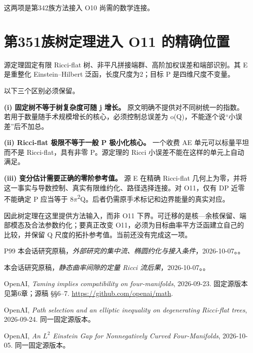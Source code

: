\documentclass[UTF8,11pt,fontset=none]{ctexart}
\begin{document}
这两项是第342族方法接入 O10 尚需的数学连接。

\section{第351族树定理进入 O11 的精确位置}\label{ch6:ux7b2c351ux65cfux6811ux5b9aux7406ux8fdbux5165-o11-ux7684ux7cbeux786eux4f4dux7f6e}

源定理固定有限 Ricci-flat 树、非平凡拼接端群、高阶加权误差和端部识别。其 E 是重整化 Einstein--Hilbert 泛函，长度尺度为2；目标 P 是四维尺度不变量。

以下三个区别必须保留。

\textbf{(i) 固定树不等于树复杂度可随 j 增长。} 原文明确不提供对不同树统一的指数。若用于数量随手术规模增长的核心，必须控制总误差为 o(Q)，不能逐个说``小误差''后不加总。

\textbf{(ii) Ricci-flat 极限不等于一般 P 极小化核心。} 一个收费 AE 单元可以标量平坦而不是 Ricci-flat，具有非零 P。源定理的 Ricci 小误差不能在这样的单元上自动满足。

\textbf{(iii) 变分估计需要正确的零阶参考值。} 源 E 在精确 Ricci-flat 几何上为零，并将这一事实与导数控制、真实有限维约化、路径选择连接。对 O11，仅有 DP 近零不能确定 P 应当等于 8\(\pi\)\textsuperscript{2}Q。后者仍需原手术标记和边界能量的真实对应。

因此树定理在这里提供方法输入，而非 O11 下界。可迁移的是核---余核保留、端部模态及合法参数约化；要真正改变 O11，必须为目标曲率平方泛函建立自己的比较，并保留 Q 尺度的拓扑参考值。当前还没有完成这一项。

\begin{thebibliography}{P99}
\small
{} 本会话研究原稿，\emph{外部研究的集中流、椭圆约化与接入条件}，2026-10-07。。

 本会话研究原稿，\emph{静态曲率间隙的定量 Ricci 流后果}，2026-10-07。。

 OpenAI, \emph{Taming implies compatibility on four-manifolds}, 2026-09-23. 固定源版本见第6章；源稿 §§6--7. \url{https://github.com/openai/math}.

 OpenAI, \emph{Path selection and an elliptic inequality on degenerating Ricci-flat trees}, 2026-09-24. 同一固定源版本。

 OpenAI, \emph{An $L^2$ Einstein Gap for Nonnegatively Curved Four-Manifolds}, 2026-10-05. 同一固定源版本。

\end{thebibliography}
\end{document}

